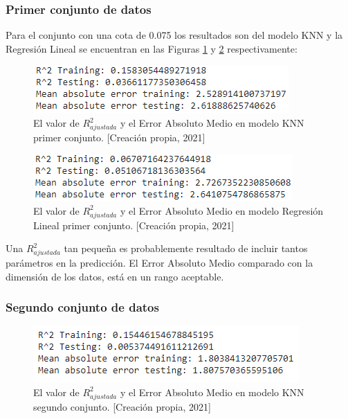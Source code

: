\documentclass{article}
\begin{document}
\subsubsection{Primer conjunto de datos}


Para el conjunto con una cota de 0.075 los resultados son del modelo KNN y la Regresión Lineal se encuentran en las Figuras \ref{fig:MetricasKNN1} y \ref{fig:MetricasMAE1} respectivamente: 


\begin{figure}[!h]
    \centering
    \includegraphics[scale=.7]{F4/F4-im32.PNG}
    \caption{El valor de $R^{2}_{ajustada}$ y el Error Absoluto Medio en modelo KNN primer conjunto. [Creación propia, 2021]}
    \label{fig:MetricasKNN1}
\end{figure}
\begin{figure}[!h]
    \centering
    \includegraphics[scale=.7]{F4/F4-im33.PNG}
    \caption{El valor de $R^{2}_{ajustada}$ y el Error Absoluto Medio en modelo Regresión Lineal primer conjunto. [Creación propia, 2021]}
    \label{fig:MetricasMAE1}
\end{figure}
\pagebreak

Una $R^{2}_{ajustada}$ tan pequeña es probablemente resultado de incluir tantos parámetros en la predicción. El Error Absoluto Medio comparado con la dimensión de los datos, está en un rango aceptable. 
\subsubsection{Segundo conjunto de datos}
\begin{figure}[!h]
    \centering
    \includegraphics[scale=.7]{F4/F4-im34.PNG}
    \caption{El valor de $R^{2}_{ajustada}$ y el Error Absoluto Medio en modelo KNN segundo conjunto. [Creación propia, 2021]}
    \label{fig:MetricasKNN2}
\end{figure}
\end{document}
